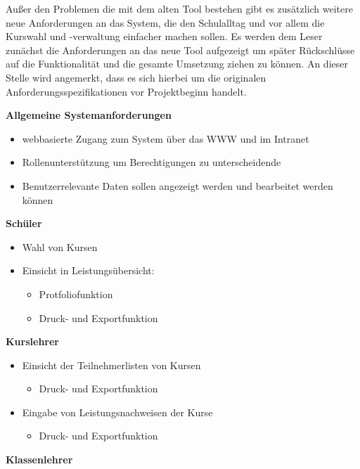 \documentclass[12pt, twoside, a4paper, ngerman]{article}
\begin{document}
Außer den Problemen die mit dem alten Tool bestehen gibt es zusätzlich weitere neue Anforderungen an das System, die den Schulalltag und vor allem die Kurswahl und -verwaltung einfacher machen sollen.
Es werden dem Leser zunächst die Anforderungen an das neue Tool aufgezeigt um später Rückschlüsse auf die Funktionalität und die gesamte Umsetzung ziehen zu können.
An dieser Stelle wird angemerkt, dass es sich hierbei um die originalen Anforderungsspezifikationen vor Projektbeginn handelt.

\textbf{Allgemeine Systemanforderungen}

\begin{itemize}
  \item webbasierte Zugang zum System über das \ac{WWW} und im Intranet
  \item Rollenunterstützung um Berechtigungen zu unterscheidende
  \item Benutzerrelevante Daten sollen angezeigt werden und bearbeitet werden können
\end{itemize}

\textbf{Schüler}

\begin{itemize}
  \item Wahl von Kursen
  \item Einsicht in Leistungsübersicht:
    \begin{itemize}
      \item Protfoliofunktion 
      \item Druck- und Exportfunktion
    \end{itemize}
\end{itemize}

\textbf{Kurslehrer}

\begin{itemize}
  \item Einsicht der Teilnehmerlisten von Kursen
  \begin{itemize}
    \item Druck- und Exportfunktion
  \end{itemize}
  \item Eingabe von Leistungsnachweisen der Kurse
  \begin{itemize}
    \item Druck- und Exportfunktion
  \end{itemize}
\end{itemize}

\textbf{Klassenlehrer}
\end{document}
